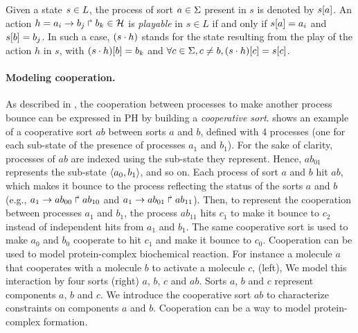 \documentclass[11pt,a4paper,twoside]{epig}
\begin{document}
\noindent
Given a state $s\in L$, the process of sort $a\in\Sigma$ present in $s$ is denoted by ${s[a]}$.
An action $h=a_i\rightarrow b_j\Rsh b_k \in \mathcal{H}$ is \emph{playable} in $s \in L$ if and only if ${s[a]}=a_i$ and ${s[b]} = b_j$.
In such a case, $(s\cdot h)$ stands for the state resulting from the play of the action $h$ in $s$, with
${(s\cdot h)[b]} = b_k$ and $\forall c \in \Sigma, c \neq b, {(s\cdot h)[c]} = {s[c]}$.

\paragraph{Modeling cooperation.}

As described in \cite{PMR10-TCSB}, the cooperation between processes to make another process bounce can be
expressed in PH by building a \emph{cooperative sort}.
 shows an example of a cooperative sort $ab$ between sorts $a$ and $b$,
defined with 4 processes (one for each sub-state of the presence of processes $a_1$ and $b_1$).
For the sake of clarity, processes of $ab$ are indexed using the sub-state they represent.
Hence, $ab_{01}$ represents the sub-state $\langle a_0,b_1 \rangle$, and so on.
Each process of sort $a$ and $b$ hit $ab$, which makes it bounce to the process reflecting the status of the sorts $a$
and $b$ (e.g., $a_1\rightarrow ab_{00}\Rsh ab_{10}$ and $a_1\rightarrow ab_{01}\Rsh ab_{11}$).
Then, to represent the cooperation between processes $a_1$ and $b_1$,
the process $ab_{11}$ hits $c_1$ to make it bounce to $c_2$ instead of
independent hits from $a_1$ and $b_1$.
The same cooperative sort is used to make $a_0$ and $b_0$ cooperate to hit $c_1$ and make it bounce to $c_0$.
Cooperation can be used to model protein-complex biochemical reaction.
For instance a molecule $a$ that cooperates with a molecule $b$ to activate a molecule $c$, 
 (left),  
We model this interaction by four sorts  (right) $a$, $b$, $c$ and $ab$. Sorts $a$, $b$ and $c$
represent components $a$, $b$ and $c$. We introduce the cooperative sort $ab$ to characterize constraints on 
components $a$ and $b$. Cooperation can be a way to model protein-complex formation.
\end{document}
